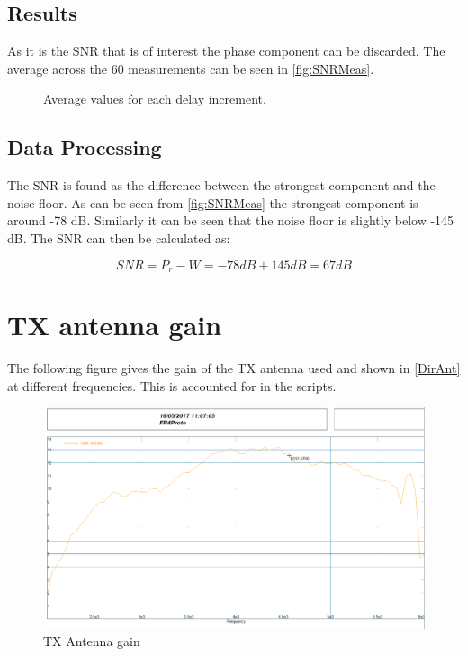 \subsection{Results}
As it is the SNR that is of interest the phase component can be discarded. The average across the 60 measurements can be seen in \autoref{fig:SNRMeas}.

\begin{figure}[H]
\centering

\caption{Average values for each delay increment.}
\label{fig:SNRMeas}
\end{figure}

\subsection{Data Processing}
The SNR is found as the difference between the strongest component and the noise floor. As can be seen from \autoref{fig:SNRMeas} the strongest component is around -78 dB. Similarly it can be seen that the noise floor is slightly below -145 dB. The SNR can then be calculated as:

\begin{equation}
SNR = P_r - W = -78dB + 145dB = 67 dB
\end{equation}
\begin{where}
\end{where}

\section{TX antenna gain}
\label{ant_adix}
The following figure gives the gain of the TX antenna used and shown in \autoref{DirAnt} at different frequencies. This is accounted for in the scripts. 

\begin{figure}[H]
\centering
\includegraphics[width=1\textwidth]{figures/Fr4Proto1Gain.png}
\caption{TX Antenna gain}
\label{fig:TX_gain}
\end{figure}
